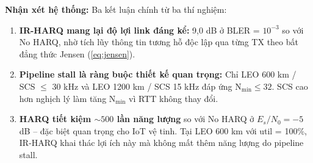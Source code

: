\textbf{Nhận xét hệ thống:} Ba kết luận chính từ ba thí nghiệm:

\begin{enumerate}
    \item \textbf{IR-HARQ mang lại độ lợi link đáng kể:} 9{,}0 dB ở BLER = $10^{-3}$ so với No HARQ, nhờ tích lũy thông tin tương hỗ độc lập qua từng TX theo bất đẳng thức Jensen (\ref{eq:jensen}).
    \item \textbf{Pipeline stall là ràng buộc thiết kế quan trọng:} Chỉ LEO 600 km / SCS $\leq$ 30 kHz và LEO 1200 km / SCS 15 kHz đáp ứng N$_{\min} \leq 32$. SCS cao hơn nghịch lý làm tăng N$_{\min}$ vì RTT không thay đổi.
    \item \textbf{HARQ tiết kiệm $\sim 500$ lần năng lượng} so với No HARQ ở $E_s/N_0 = -5$ dB -- đặc biệt quan trọng cho IoT vệ tinh. Tại LEO 600 km với util = 100\%, IR-HARQ khai thác lợi ích này mà không mất thêm năng lượng do pipeline stall.
\end{enumerate}
